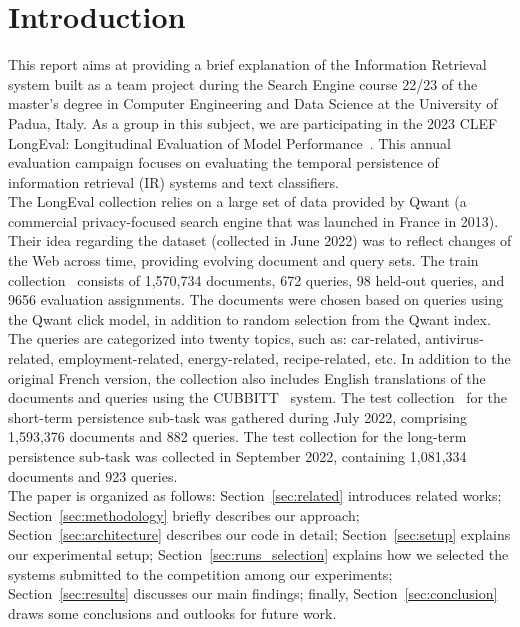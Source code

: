 \section{Introduction}
\label{sec:introduction}

This report aims at providing a brief explanation of the Information Retrieval system built as a team project during the
Search Engine course 22/23 of the master's degree in Computer Engineering and Data Science at the University of Padua,
Italy.
As a group in this subject, we are participating in the 2023 CLEF LongEval: Longitudinal Evaluation of Model
Performance~\cite{LongEval}.
This annual evaluation campaign focuses on evaluating the temporal persistence of information retrieval (IR) systems and
text classifiers.\\

The LongEval collection relies on a large set of data provided by Qwant (a commercial privacy-focused
search engine that was launched in France in 2013).
Their idea regarding the dataset (collected in June 2022) was to reflect changes of the Web across time, providing
evolving document and query sets.
The train collection~\cite{traindata} consists of 1,570,734 documents, 672 queries, 98 held-out queries, and 9656
evaluation assignments.
The documents were chosen based on queries using the Qwant click model, in addition to random selection from the Qwant
index.
The queries are categorized into twenty topics, such as: car-related, antivirus-related, employment-related,
energy-related, recipe-related, etc.
In addition to the original French version, the collection also includes English translations of the documents and
queries using the CUBBITT~\cite{CUBBITT} system.
The test collection~\cite{testdata} for the short-term persistence sub-task was gathered during July 2022, comprising
1,593,376 documents and 882 queries.
The test collection for the long-term persistence sub-task was collected in September 2022, containing 1,081,334
documents and 923 queries.\\

The paper is organized as follows: Section~\ref{sec:related} introduces related works;
Section~\ref{sec:methodology} briefly describes our approach;
Section~\ref{sec:architecture} describes our code in detail;
Section~\ref{sec:setup} explains our experimental setup;
Section~\ref{sec:runs_selection} explains how we selected the systems submitted to the competition among our
experiments;
Section~\ref{sec:results} discusses our main findings;
finally, Section~\ref{sec:conclusion} draws some conclusions and outlooks for future work.